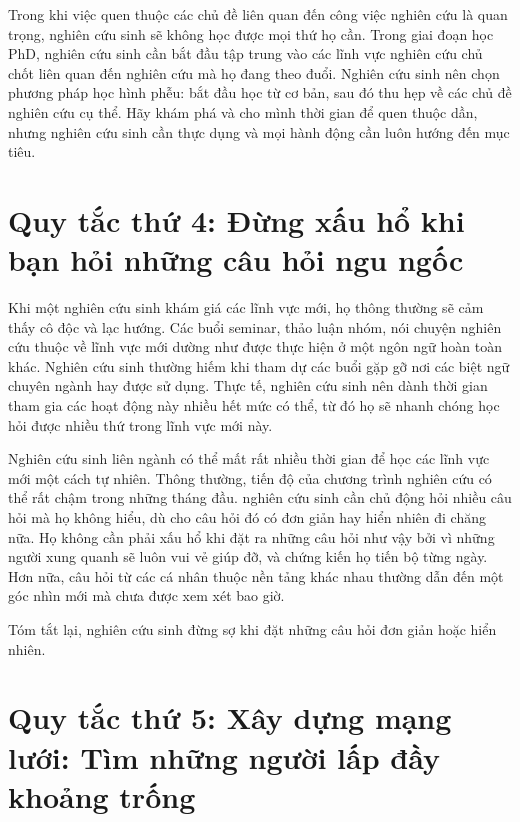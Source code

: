 \documentclass[12pt]{report}
\begin{document}
Trong khi việc quen thuộc các chủ đề liên quan đến công việc nghiên cứu là quan trọng, nghiên cứu sinh sẽ không học được mọi thứ họ cần. Trong giai đoạn học PhD, nghiên cứu sinh cần bắt đầu tập trung vào các lĩnh vực nghiên cứu chủ chốt liên quan đến nghiên cứu mà họ đang theo đuổi. Nghiên cứu sinh nên chọn phương pháp học hình phễu: bắt đầu học từ cơ bản, sau đó thu hẹp về các chủ đề nghiên cứu cụ thể. Hãy khám phá và cho mình thời gian để quen thuộc dần, nhưng nghiên cứu sinh cần thực dụng và mọi hành động cần luôn hướng đến mục tiêu.

\section{Quy tắc thứ 4: Đừng xấu hổ khi bạn hỏi những câu hỏi ngu ngốc}

Khi một nghiên cứu sinh khám giá các lĩnh vực mới, họ thông thường sẽ cảm thấy cô độc và lạc hướng. Các buổi seminar, thảo luận nhóm, nói chuyện nghiên cứu thuộc về lĩnh vực mới dường như được thực hiện ở một ngôn ngữ hoàn toàn khác. Nghiên cứu sinh thường hiếm khi tham dự các buổi gặp gỡ nơi các biệt ngữ chuyên ngành hay được sử dụng. Thực tế, nghiên cứu sinh nên dành thời gian tham gia các hoạt động này nhiều hết mức có thể, từ đó họ sẽ nhanh chóng học hỏi được nhiều thứ trong lĩnh vực mới này.

Nghiên cứu sinh liên ngành có thể mất rất nhiều thời gian để học các lĩnh vực mới một cách tự nhiên. Thông thường, tiến độ của chương trình nghiên cứu có thể rất chậm trong những tháng đầu. nghiên cứu sinh cần chủ động hỏi nhiều câu hỏi mà họ không hiểu, dù cho câu hỏi đó có đơn giản hay hiển nhiên đi chăng nữa. Họ không cần phải xấu hổ khi đặt ra những câu hỏi như vậy bởi vì những người xung quanh sẽ luôn vui vẻ giúp đỡ, và chứng kiến họ tiến bộ từng ngày. Hơn nữa, câu hỏi từ các cá nhân thuộc nền tảng khác nhau thường dẫn đến một góc nhìn mới mà chưa được xem xét bao giờ.

Tóm tắt lại, nghiên cứu sinh đừng sợ khi đặt những câu hỏi đơn giản hoặc hiển nhiên.

\section{Quy tắc thứ 5: Xây dựng mạng lưới: Tìm những người lấp đầy khoảng trống}
\end{document}

